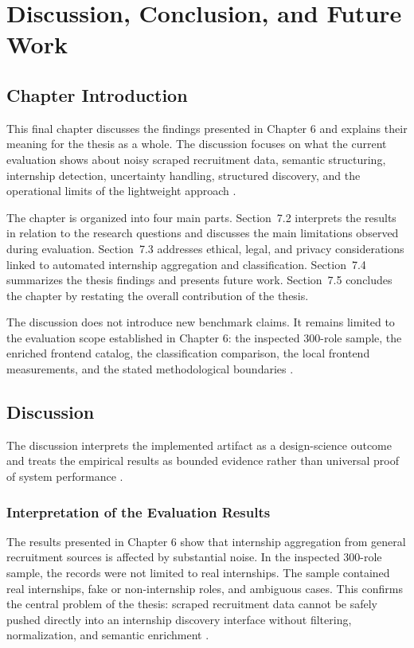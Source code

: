 \chapter{Discussion, Conclusion, and Future Work}

\section{Chapter Introduction}

This final chapter discusses the findings presented in Chapter 6 and explains their meaning
for the thesis as a whole. The discussion focuses on what the current evaluation shows about
noisy scraped recruitment data, semantic structuring, internship detection, uncertainty
handling, structured discovery, and the operational limits of the lightweight approach \cite{wohlin2012experimentation, peffers2007design}.

The chapter is organized into four main parts. Section~7.2 interprets the results in relation to
the research questions and discusses the main limitations observed during evaluation.
Section~7.3 addresses ethical, legal, and privacy considerations linked to automated internship
aggregation and classification. Section~7.4 summarizes the thesis findings and presents future
work. Section~7.5 concludes the chapter by restating the overall contribution of the thesis.

The discussion does not introduce new benchmark claims. It remains limited to the evaluation
scope established in Chapter 6: the inspected 300-role sample, the enriched frontend catalog,
the classification comparison, the local frontend measurements, and the stated
methodological boundaries \cite{wohlin2012experimentation, jain1991art}.


\section{Discussion}

The discussion interprets the implemented artifact as a design-science outcome and treats the empirical results as bounded evidence rather than universal proof of system performance \cite{hevner2004design, peffers2007design, wohlin2012experimentation}.

\subsection{Interpretation of the Evaluation Results}

The results presented in Chapter 6 show that internship aggregation from general recruitment
sources is affected by substantial noise. In the inspected 300-role sample, the records were
not limited to real internships. The sample contained real internships, fake or non-internship
roles, and ambiguous cases. This confirms the central problem of the thesis: scraped
recruitment data cannot be safely pushed directly into an internship discovery interface
without filtering, normalization, and semantic enrichment \cite{batini2009methodologies}.


